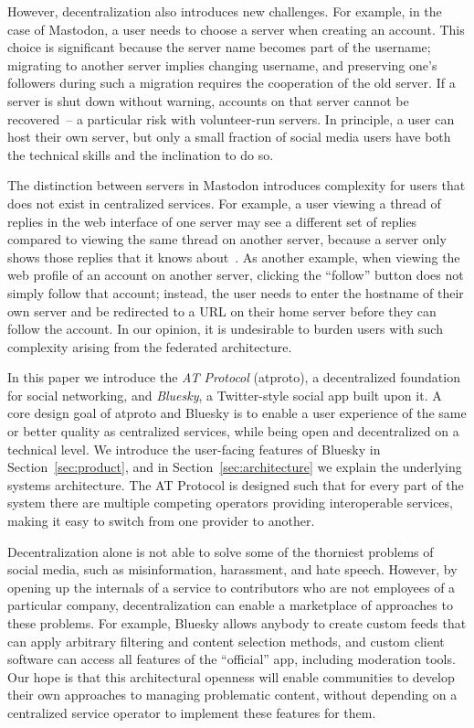 \documentclass[sigconf,review]{acmart}
\begin{document}
However, decentralization also introduces new challenges.
For example, in the case of Mastodon, a user needs to choose a server when creating an account.
This choice is significant because the server name becomes part of the username; migrating to another server implies changing username, and preserving one's followers during such a migration requires the cooperation of the old server.
If a server is shut down without warning, accounts on that server cannot be recovered~-- a particular risk with volunteer-run servers.
In principle, a user can host their own server, but only a small fraction of social media users have both the technical skills and the inclination to do so.

The distinction between servers in Mastodon introduces complexity for users that does not exist in centralized services.
For example, a user viewing a thread of replies in the web interface of one server may see a different set of replies compared to viewing the same thread on another server, because a server only shows those replies that it knows about~\cite{Adida:2022}.
As another example, when viewing the web profile of an account on another server, clicking the ``follow'' button does not simply follow that account; instead, the user needs to enter the hostname of their own server and be redirected to a URL on their home server before they can follow the account.
In our opinion, it is undesirable to burden users with such complexity arising from the federated architecture.

In this paper we introduce the \emph{AT Protocol} (atproto), a decentralized foundation for social networking, and \emph{Bluesky}, a Twitter-style social app built upon it.
A core design goal of atproto and Bluesky is to enable a user experience of the same or better quality as centralized services, while being open and decentralized on a technical level.
We introduce the user-facing features of Bluesky in Section~\ref{sec:product}, and in Section~\ref{sec:architecture} we explain the underlying systems architecture.
The AT Protocol is designed such that for every part of the system there are multiple competing operators providing interoperable services, making it easy to switch from one provider to another.

Decentralization alone is not able to solve some of the thorniest problems of social media, such as misinformation, harassment, and hate speech.
However, by opening up the internals of a service to contributors who are not employees of a particular company, decentralization can enable a marketplace of approaches to these problems.
For example, Bluesky allows anybody to create custom feeds that can apply arbitrary filtering and content selection methods, and custom client software can access all features of the ``official'' app, including moderation tools.
Our hope is that this architectural openness will enable communities to develop their own approaches to managing problematic content, without depending on a centralized service operator to implement these features for them.
\end{document}
